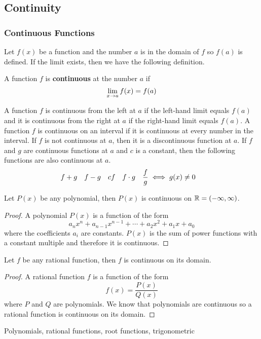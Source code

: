 \subsection{Continuity}
\subsubsection{Continuous Functions}
Let \(f(x)\) be a function and the number \(a\) is in the domain of \(f\) so
\(f(a)\) is defined.
If the limit exists, then we have the following definition.
\begin{definition}
    A function \(f\) is \textbf{continuous} at the number \(a\) if
    \[\lim_{x\to a}f(x)=f(a)\qedhere\]
\end{definition}
A function \(f\) is continuous from the left at \(a\) if the left-hand limit
equals \(f(a)\) and it is continuous from the right at \(a\) if the right-hand
limit equals \(f(a)\).
A function \(f\) is continuous on an interval if it is continuous
at every number in the interval.
If \(f\) is not continuous at \(a\),
then it is a discontinuous function at \(a\).
If \(f\) and \(g\) are continuous functions at \(a\) and \(c\) is a constant,
then the following functions are also continuous at \(a\).
    \begin{align*}
        &f+g & f-g && cf && f\cdot g && \dfrac{f}{g}\iff g(x)\neq 0 &\qedhere
    \end{align*}
\begin{theorem}
    Let \(P(x)\) be any polynomial, then \(P(x)\) is continuous on
    \(\mathbb{R}=(-\infty,\infty)\).
\end{theorem}
\begin{proof}
    A polynomial \(P(x)\) is a function of the form
    \[a_nx^n+a_{n-1}x^{n-1}+\dotsb +a_{2}x^{2}+a_1x+a_0\]
    where the coefficients \(a_i\) are constants.
    \(P(x)\) is the sum of power functions with a constant multiple and
    therefore it is continuous.
\end{proof}
\begin{theorem}
    Let \(f\) be any rational function,
    then \(f\) is continuous on its domain.
\end{theorem}
\begin{proof}
    A rational function \(f\) is a function of the form
    \[f(x)=\frac{P(x)}{Q(x)}\] where \(P\) and \(Q\) are polynomials.
    We know that polynomials are continuous so a rational function is
    continuous on its domain.
\end{proof}
Polynomials, rational functions, root functions, trigonometric
